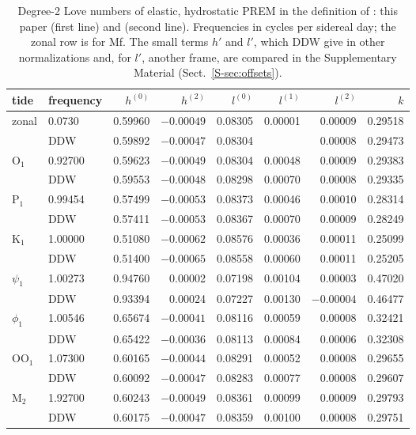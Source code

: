 \begin{table}
\caption{Degree-2 Love numbers of elastic, hydrostatic PREM in the definition
of \citet{mathews1995}: this paper (first line) and \citet[][DDW,
tables~11 and 12]{dehant1999} (second line). Frequencies in cycles per sidereal
day; the zonal row is for Mf. The small terms $h'$ and $l'$, which DDW give in other normalizations and,
for $l'$, another frame, are compared in the Supplementary Material
(Sect.~\ref{S-sec:offsets}).}
\label{tab:ddw}
\small\setlength{\tabcolsep}{3pt}
\begin{tabular*}{\textwidth}{@{\extracolsep{\fill}}llrrrrrr@{}}
\toprule
tide & frequency & $h^{(0)}$ & $h^{(2)}$ & $l^{(0)}$ & $l^{(1)}$ & $l^{(2)}$ & $k$ \\
\midrule
zonal & 0.0730 & 0.59960 & $-0.00049$ & 0.08305 & 0.00001 & 0.00009 & 0.29518 \\
 & DDW & 0.59892 & $-0.00047$ & 0.08304 &  & 0.00008 & 0.29473 \\
O$_1$ & 0.92700 & 0.59623 & $-0.00049$ & 0.08304 & 0.00048 & 0.00009 & 0.29383 \\
 & DDW & 0.59553 & $-0.00048$ & 0.08298 & 0.00070 & 0.00008 & 0.29335 \\
P$_1$ & 0.99454 & 0.57499 & $-0.00053$ & 0.08373 & 0.00046 & 0.00010 & 0.28314 \\
 & DDW & 0.57411 & $-0.00053$ & 0.08367 & 0.00070 & 0.00009 & 0.28249 \\
K$_1$ & 1.00000 & 0.51080 & $-0.00062$ & 0.08576 & 0.00036 & 0.00011 & 0.25099 \\
 & DDW & 0.51400 & $-0.00065$ & 0.08558 & 0.00060 & 0.00011 & 0.25205 \\
$\psi_1$ & 1.00273 & 0.94760 & 0.00002 & 0.07198 & 0.00104 & 0.00003 & 0.47020 \\
 & DDW & 0.93394 & 0.00024 & 0.07227 & 0.00130 & $-0.00004$ & 0.46477 \\
$\phi_1$ & 1.00546 & 0.65674 & $-0.00041$ & 0.08116 & 0.00059 & 0.00008 & 0.32421 \\
 & DDW & 0.65422 & $-0.00036$ & 0.08113 & 0.00084 & 0.00006 & 0.32308 \\
OO$_1$ & 1.07300 & 0.60165 & $-0.00044$ & 0.08291 & 0.00052 & 0.00008 & 0.29655 \\
 & DDW & 0.60092 & $-0.00047$ & 0.08283 & 0.00077 & 0.00008 & 0.29607 \\
M$_2$ & 1.92700 & 0.60243 & $-0.00049$ & 0.08361 & 0.00099 & 0.00009 & 0.29793 \\
 & DDW & 0.60175 & $-0.00047$ & 0.08359 & 0.00100 & 0.00008 & 0.29751 \\
\bottomrule
\end{tabular*}
\end{table}
